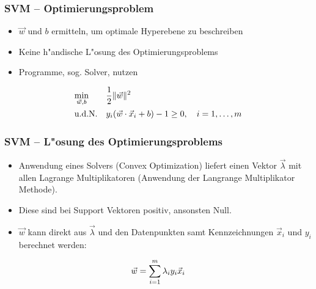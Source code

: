 
\begin{frame}

\frametitle{SVM -- Optimierungsproblem}

\begin{itemize}
	\setlength{\itemsep}{10pt}
	\item $\vec{w}$ und $b$ ermitteln, um optimale Hyperebene zu beschreiben
	\item Keine h"andische L"osung des Optimierungsproblems
	\item Programme, sog. Solver, nutzen
\end{itemize}

\begin{equation}
	\begin{aligned}
		& \underset{\vec{w},b}{\min} && \frac{1}{2} \Vert\vec{w}\Vert^2 \notag \\
		& \textrm{u.d.N.}            && y_i(\vec{w}\cdot\vec{x}_i+b)-1 \geq 0, \quad i=1,\ldots,m
	\end{aligned}
\end{equation}

\end{frame}






\begin{frame}

\frametitle{SVM -- L"osung des Optimierungsproblems}

\begin{itemize}
	\setlength{\itemsep}{15pt}
	\item Anwendung eines Solvers (Convex Optimization) liefert einen Vektor $\vec{\lambda}$ mit allen Lagrange Multiplikatoren (Anwendung der Langrange Multiplikator Methode).
	\item Diese sind bei Support Vektoren positiv, ansonsten Null.
	\item $\vec{w}$ kann direkt aus $\vec{\lambda}$ und den Datenpunkten samt Kennzeichnungen $\vec{x}_i$ und $y_i$ berechnet werden:
\end{itemize}

\begin{equation}
	\vec{w}=\sum\limits_{i=1}^m \lambda_i y_i \vec{x}_i \notag
\end{equation}

\end{frame}





